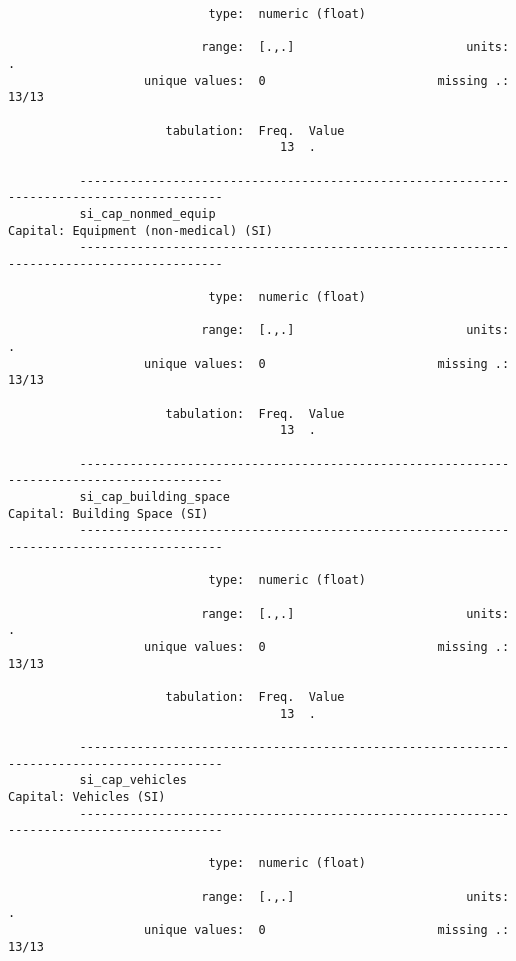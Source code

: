 \documentclass{article}
\begin{document}
\begin{verbatim}
                            type:  numeric (float)
          
                           range:  [.,.]                        units:  .
                   unique values:  0                        missing .:  13/13
          
                      tabulation:  Freq.  Value
                                      13  .
          
          ------------------------------------------------------------------------------------------
          si_cap_nonmed_equip                                  Capital: Equipment (non-medical) (SI)
          ------------------------------------------------------------------------------------------
          
                            type:  numeric (float)
          
                           range:  [.,.]                        units:  .
                   unique values:  0                        missing .:  13/13
          
                      tabulation:  Freq.  Value
                                      13  .
          
          ------------------------------------------------------------------------------------------
          si_cap_building_space                                         Capital: Building Space (SI)
          ------------------------------------------------------------------------------------------
          
                            type:  numeric (float)
          
                           range:  [.,.]                        units:  .
                   unique values:  0                        missing .:  13/13
          
                      tabulation:  Freq.  Value
                                      13  .
          
          ------------------------------------------------------------------------------------------
          si_cap_vehicles                                                     Capital: Vehicles (SI)
          ------------------------------------------------------------------------------------------
          
                            type:  numeric (float)
          
                           range:  [.,.]                        units:  .
                   unique values:  0                        missing .:  13/13
          

\end{verbatim}
\end{document}
